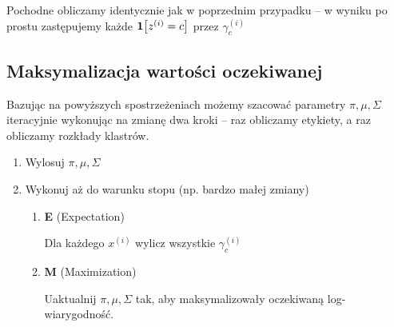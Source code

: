 Pochodne obliczamy identycznie jak w poprzednim przypadku -- w wyniku po prostu zastępujemy każde \( \indicator{z^{(i)} = c} \) przez \( \gamma^{(i)}_c \)

\subsection{Maksymalizacja wartości oczekiwanej}

Bazując na powyższych spostrzeżeniach możemy szacować parametry \( \pi, \mu, \Sigma \) iteracyjnie wykonując na zmianę dwa kroki -- raz obliczamy etykiety, a raz obliczamy rozkłady klastrów.

\begin{enumerate}
	\item Wylosuj \( \pi, \mu, \Sigma \)
	\item Wykonuj aż do warunku stopu (np. bardzo małej zmiany)
	      \begin{enumerate}
		      \item \textbf{E} (Expectation)

		            Dla każdego \( x^{(i)} \)  wylicz wszystkie \( \gamma^{(i)}_c \)

		      \item \textbf{M} (Maximization)

		            Uaktualnij \( \pi, \mu, \Sigma \) tak, aby maksymalizowały oczekiwaną log-wiarygodność.
	      \end{enumerate}
\end{enumerate}